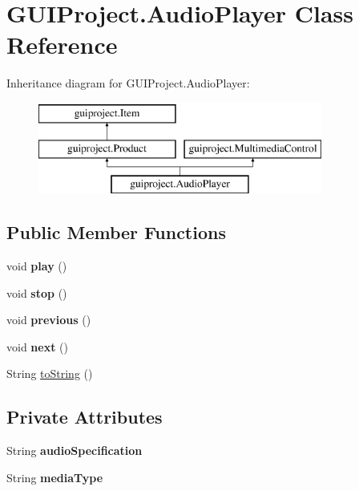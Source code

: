 \hypertarget{class_g_u_i_project_1_1_audio_player}{}\section{G\+U\+I\+Project.\+Audio\+Player Class Reference}
\label{class_g_u_i_project_1_1_audio_player}
Inheritance diagram for G\+U\+I\+Project.\+Audio\+Player\+:\begin{figure}[H]
\begin{center}
\leavevmode
\includegraphics[height=3.000000cm]{class_g_u_i_project_1_1_audio_player}
\end{center}
\end{figure}
\subsection*{Public Member Functions}
\begin{DoxyCompactItemize}
\item 
\mbox{\label{class_g_u_i_project_1_1_audio_player_a54fd5e54dbbcb961704de9aee0972e22}} 
void {\bfseries play} ()
\item 
\mbox{\label{class_g_u_i_project_1_1_audio_player_a182764c3ba6104c5080b5cf8acf09710}} 
void {\bfseries stop} ()
\item 
\mbox{\label{class_g_u_i_project_1_1_audio_player_a52861751b32a6c96a921c0f247a1b243}} 
void {\bfseries previous} ()
\item 
\mbox{\label{class_g_u_i_project_1_1_audio_player_a03111f41b181ac3cc3599bd871872152}} 
void {\bfseries next} ()
\item 
String \mbox{\hyperlink{class_g_u_i_project_1_1_audio_player_a2935cc2da8c1ef1bbcf2c7566fafbc74}{to\+String}} ()
\end{DoxyCompactItemize}
\subsection*{Private Attributes}
\begin{DoxyCompactItemize}
\item 
\mbox{\label{class_g_u_i_project_1_1_audio_player_a1813e827480a776e57fe7ae4270adb5d}} 
String {\bfseries audio\+Specification}
\item 
\mbox{\label{class_g_u_i_project_1_1_audio_player_a813a3f7e74ba192aa6cd76e7ee5849a4}} 
String {\bfseries media\+Type}
\end{DoxyCompactItemize}
